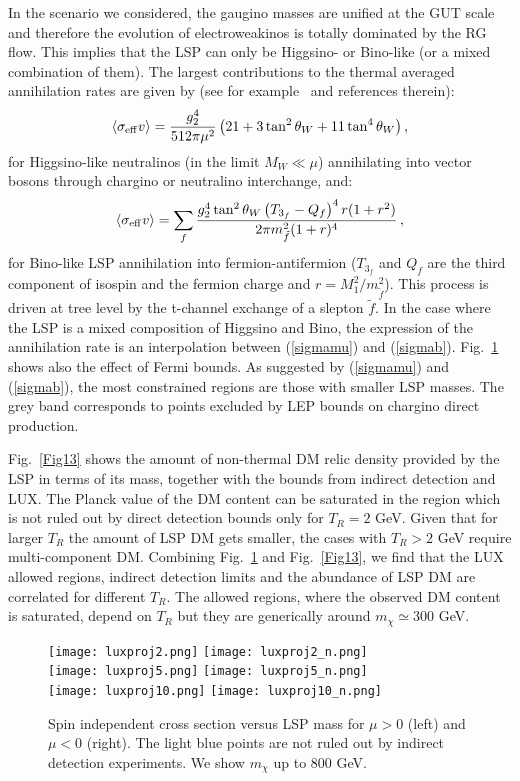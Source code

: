 \documentclass[11pt,a4paper]{article}
\newcommand{\be}{\begin{equation}}
\newcommand{\ee}{\end{equation}}
\begin{document}
In the scenario we considered, the gaugino masses are unified at the GUT scale and therefore the evolution of electroweakinos is totally dominated by the RG flow. This implies that the LSP can only be Higgsino- or Bino-like (or a mixed combination of them). The largest contributions to the thermal averaged annihilation rates are given by (see for example~\citep{ArkaniHamed:2006mb} and references therein):
\be
\langle \sigma_{\rm eff} v \rangle = \frac{g_2^4}{512 \pi \mu^2}\left(21 + 3 \tan^2\theta_W +  11 \tan^4\theta_W   \right),
\label{sigmamu}
\ee
for Higgsino-like neutralinos (in the limit $M_W \ll \mu$) annihilating into vector bosons through chargino or neutralino interchange, and:
\be
\langle  \sigma_{\rm eff} v \rangle =  \sum_f \frac{g_2^4 \tan^2 \theta_W \left( T_{3_f} - Q_f \right)^4 r (1+r^2)}{2\pi m_{\tilde f}^2(1+r)^4}\,,
\label{sigmab}
\ee
for Bino-like LSP annihilation into fermion-antifermion ($T_{3_f}$ and $Q_f$ are the third component of isospin and the fermion charge and $r = M_1^2 / m_{\tilde f}^2$). This process is driven at tree level by the t-channel exchange of a slepton ${\tilde f}$. In the case where the LSP is a mixed composition of Higgsino and Bino, the expression of the annihilation rate is an interpolation between (\ref{sigmamu}) and (\ref{sigmab}).
Fig.~\ref{Fig12} shows also the effect of Fermi bounds. As suggested by (\ref{sigmamu}) and (\ref{sigmab}), the most constrained regions are those with smaller LSP masses. The grey band corresponds to points excluded by LEP bounds on chargino direct production.

Fig.~\ref{Fig13} shows the amount of non-thermal DM relic density provided by the LSP in terms of its mass, together with the bounds from indirect detection and LUX. The Planck value of the DM content can be saturated in the region which is not ruled out by direct detection bounds only for $T_R = 2$ GeV. Given that for larger $T_R$ the amount of LSP DM gets smaller, the cases with $T_R > 2$ GeV require multi-component DM. Combining  Fig.~\ref{Fig12} and Fig.~\ref{Fig13}, we find  that the LUX allowed regions, indirect detection limits and the abundance of LSP DM are correlated for different $T_R$. The allowed regions, where the observed DM content is saturated, depend on $T_R$ but they are generically around $m_\chi \simeq 300$ GeV.
\begin{figure}[!ht]
\centering
\texttt{[image: luxproj2.png]}
\texttt{[image: luxproj2\_n.png]}\\[-0.3cm]
\texttt{[image: luxproj5.png]}
\texttt{[image: luxproj5\_n.png]}\\[-0.3cm]
\texttt{[image: luxproj10.png]}
\texttt{[image: luxproj10\_n.png]}\\[-0.2cm]
\caption{Spin independent cross section versus LSP mass for $\mu>0$ (left) and $\mu<0$ (right). The light blue points are not ruled out by indirect detection experiments. We show $m_{\chi}$ up to 800 GeV.}
\label{Fig12}
\end{figure}
\end{document}
